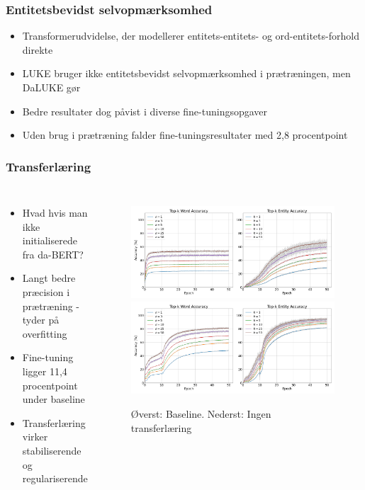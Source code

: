 \documentclass{beamer}
\begin{document}
\begin{frame}
    \frametitle{Entitetsbevidst selvopmærksomhed}
    \begin{itemize}
        \item Transformerudvidelse, der modellerer entitets-entitets- og ord-entitets-forhold direkte
        \item LUKE bruger ikke entitetsbevidst selvopmærksomhed i prætræningen, men DaLUKE gør
        \item Bedre resultater dog påvist i diverse fine-tuningsopgaver
        \item Uden brug i prætræning falder fine-tuningsresultater med 2,8 procentpoint
    \end{itemize}
\end{frame}

\begin{frame}
    \frametitle{Transferlæring}
    \begin{columns}
        \begin{itemize}
            \item Hvad hvis man ikke initialiserede fra da-BERT?
            \item Langt bedre præcision i prætræning - tyder på overfitting
            \item Fine-tuning ligger 11,4 procentpoint under baseline
            \item Transferlæring virker stabiliserende og regulariserende
        \end{itemize}
        \begin{figure}[H]
            \centering
            \includegraphics[width=.85\textwidth]{baseline-acc}
            \includegraphics[width=.85\textwidth]{nobert-acc}
            \caption{Øverst: Baseline. Nederst: Ingen transferlæring}
        \end{figure}\noindent
    \end{columns}
\end{frame}
\end{document}
